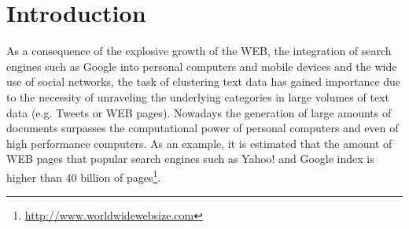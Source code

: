 \documentclass[10pt]{article}
\begin{document}
\section{Introduction}
As a consequence of the explosive growth of the WEB, the integration of search engines such as Google into personal computers and mobile devices and the wide use of social networks, the task of clustering text data has gained importance due to the necessity of unraveling the underlying categories in large volumes of text data (e.g. Tweets or WEB pages). Nowadays the generation of large amounts of documents surpasses the computational power of personal computers and even of high performance computers.
As an example, it is estimated that the amount of WEB pages that popular search engines such as Yahoo! and Google index is higher than 40 billion of pages\footnote{\url{http://www.worldwidewebsize.com}}.
\end{document}
